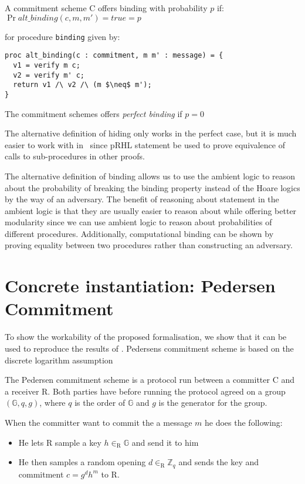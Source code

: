 \begin{definition}
  \label{def:commitment:alt-binding}
  A commitment scheme C offers binding with probability $p$ if:
  $\Pr{alt\_{binding}(c, m, m') = true} = p$

  for procedure \texttt{binding} given by:
\begin{lstlisting}[mathescape]
proc alt_binding(c : commitment, m m' : message) = {
  v1 = verify m c;
  v2 = verify m' c;
  return v1 /\ v2 /\ (m $\neq$ m');
}
\end{lstlisting}

  The commitment schemes offers \textit{perfect binding} if $p = 0$
\end{definition}

The alternative definition of hiding only works in the perfect case, but it is much easier
to work with in \easycrypt\  since pRHL statement be used to prove
equivalence of calls to sub-procedures in other proofs.

The alternative definition of binding allows us to use the ambient logic to
reason about the probability of breaking the binding property instead of the
Hoare logics by the way of an adversary.
The benefit of reasoning about
statement in the ambient logic is that they are usually easier to reason about
while offering better modularity since we can use ambient logic to
reason about probabilities of different procedures.
Additionally, computational binding can be shown by proving equality between two
procedures rather than constructing an adversary.


\section{Concrete instantiation: Pedersen Commitment}
\label{sec:pedersen}

To show the workability of the proposed formalisation, we show that it can be
used to reproduce the results of \cite{DBLP:journals/corr/MetereD17}. Pedersens
commitment scheme is based on the discrete logarithm assumption

The Pedersen commitment scheme is a protocol run between a committer C and a
receiver R. Both parties have before running the protocol agreed on a group
$(\mathbb{G}, q, g)$, where $q$ is the order of $\mathbb{G}$ and $g$ is the
generator for the group.

When the committer want to commit the a message $m$ he does the following:
\begin{itemize}
  \item He lets R sample a key $h \in_{\text{R}} \mathbb{G}$ and send it to him
  \item He then samples a random opening $d \in_{\text{R}} \mathbb{Z}_{q}$ and sends the
    key and commitment $c = g^{d}h^{m}$ to R.
\end{itemize}


